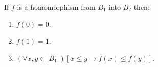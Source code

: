 If $f$ is a homomorphism from $B_1$ into $B_2$ then:
\begin{enumerate}
\item $f(0) = 0$.
\item $f(1) = 1$.
\item $(\forall x, y \in |B_1|)[x \leq y \rightarrow f(x) \leq f(y)]$.
\end{enumerate}
